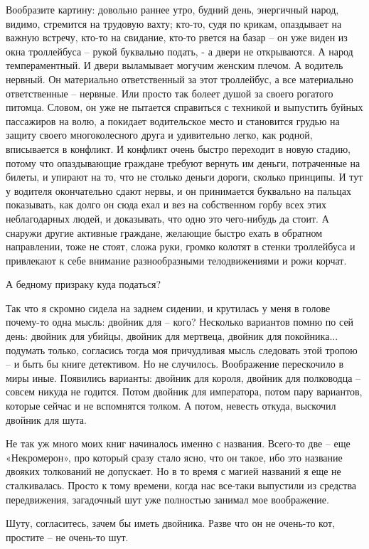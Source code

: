 Вообразите картину: довольно раннее утро, будний день, энергичный народ,
видимо, стремится на трудовую вахту; кто-то, судя по крикам, опаздывает на
важную встречу, кто-то на свидание, кто-то рвется на базар – он уже виден из
окна троллейбуса – рукой буквально подать, - а двери не открываются. А народ
темпераментный. И двери выламывает могучим женским плечом. А водитель нервный.
Он материально ответственный за этот троллейбус, а все материально
ответственные – нервные. Или просто так болеет душой за своего рогатого
питомца. Словом, он уже не пытается справиться с техникой и выпустить буйных
пассажиров на волю, а покидает водительское место и становится грудью на защиту
своего многоколесного друга и удивительно легко, как родной, вписывается в
конфликт. И конфликт очень быстро переходит в новую стадию, потому что
опаздывающие граждане требуют вернуть им деньги, потраченные на билеты, и
упирают на то, что не столько деньги дороги, сколько принципы. И тут у водителя
окончательно сдают нервы, и он принимается буквально на пальцах показывать, как
долго он сюда ехал и вез на собственном горбу всех этих неблагодарных людей, и
доказывать, что одно это чего-нибудь да стоит. А снаружи другие активные
граждане, желающие быстро ехать в обратном направлении, тоже не стоят, сложа
руки, громко колотят в стенки троллейбуса и привлекают к себе внимание
разнообразными телодвижениями и рожи корчат.

А бедному призраку куда податься?

Так что я скромно сидела на заднем сидении, и крутилась у меня в голове
почему-то одна мысль: двойник для – кого? Несколько вариантов помню по сей
день: двойник для убийцы, двойник для мертвеца, двойник для покойника...
подумать только, согласись тогда моя причудливая мысль следовать этой тропою –
и быть бы книге детективом. Но не случилось. Воображение перескочило в миры
иные.  Появились варианты: двойник для короля, двойник для полководца – совсем
никуда не годится. Потом двойник для императора, потом пару вариантов, которые
сейчас и не вспомнятся толком. А потом, невесть откуда, выскочил двойник для
шута.

Не так уж много моих книг начиналось именно с названия. Всего-то две – еще
«Некромерон», про который сразу стало ясно, что он такое, ибо это название
двояких толкований не допускает. Но в то время с магией названий я еще не
сталкивалась. Просто к тому времени, когда нас все-таки выпустили из средства
передвижения, загадочный шут уже полностью занимал мое воображение.

Шуту, согласитесь, зачем бы иметь двойника. Разве что он не очень-то кот, простите – не очень-то шут.


